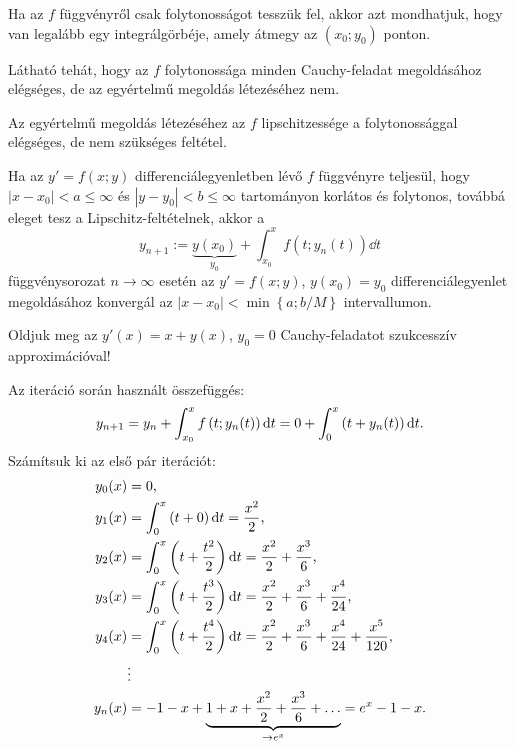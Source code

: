 \begin{theorem}
  Ha az $f$ függvényről csak folytonosságot tesszük fel, akkor azt mondhatjuk,
  hogy van legalább egy integrálgörbéje, amely átmegy az
  $\left( x_0 ; y_0 \right)$ ponton.
\end{theorem}

\begin{note}[][nobreak]
  Látható tehát, hogy az $f$ folytonossága minden Cauchy-feladat megoldásához
  elégséges, de az egyértelmű megoldás létezéséhez nem.

  Az egyértelmű megoldás létezéséhez az $f$ lipschitzessége a folytonossággal
  elégséges, de nem szükséges feltétel.
\end{note}

\begin{theorem}
  Ha az $y' = f(x; y)$ differenciálegyenletben lévő $f$ függvényre teljesül,
  hogy $\left| x - x_0 \right| < a \leq \infty$ és $\left| y - y_0 \right| < b
    \leq \infty$ tartományon korlátos és folytonos, továbbá eleget tesz a
  Lipschitz-feltételnek, akkor a
  $$
    y_{n + 1}
    := \underbrace{y(x_0)}_{y_0}
    + \int_{x_0}^x f\left(
    t; y_{n}(t)
    \right) \dd t
  $$
  függvénysorozat $n \rightarrow \infty$ esetén az $y' = f(x; y)$, $y(x_0) =
    y_0$ differenciálegyenlet megoldásához konvergál az  $\left| x - x_0 \right|
    < \min \left\{ a; b/M \right\}$  intervallumon.
\end{theorem}

\begin{example}
  Oldjuk meg az $y'(x) = x + y(x)$, $y_0 = 0$ Cauchy-feladatot szukcesszív
  approximációval!

  \boxrule

  Az iteráció során használt összefüggés:
  $$
    y_{n + 1}
    = y_n + \int_{x_0}^x f\left( t; y_{n}(t) \right) \mathop{}\!\mathrm{d} t
    = 0 + \int_0^x \left( t + y_n(t) \right) \mathop{}\!\mathrm{d} t
    \text.
  $$
  Számítsuk ki az első pár iterációt:
  \begin{align*}
    y_0(x)  & = 0 \text,
    \\
    y_1(x)  & = \int_0^x \left( t + 0 \right) \mathop{}\!\mathrm{d} t = \frac{x^2}{2} \text,
    \\
    y_2(x)  & = \int_0^x \left( t + \frac{t^2}{2} \right) \mathop{}\!\mathrm{d} t
    = \frac{x^2}{2} + \frac{x^3}{6} \text,
    \\
    y_3 (x) & = \int_0^x \left( t + \frac{t^3}{2} \right) \mathop{}\!\mathrm{d} t
    = \frac{x^2}{2} + \frac{x^3}{6} + \frac{x^4}{24} \text,
    \\
    y_4(x)  & = \int_0^x \left( t + \frac{t^4}{2} \right) \mathop{}\!\mathrm{d} t
    = \frac{x^2}{2} + \frac{x^3}{6} + \frac{x^4}{24} + \frac{x^5}{120} \text,
    \\
            & \vdots
    \\
    y_n(x)  & = -1 -x + \underbrace{1 + x + \frac{x^2}{2} + \frac{x^3}{6} + \dots}_{\to e^x}
    = e^x - 1 - x
    \text.
  \end{align*}
\end{example}

